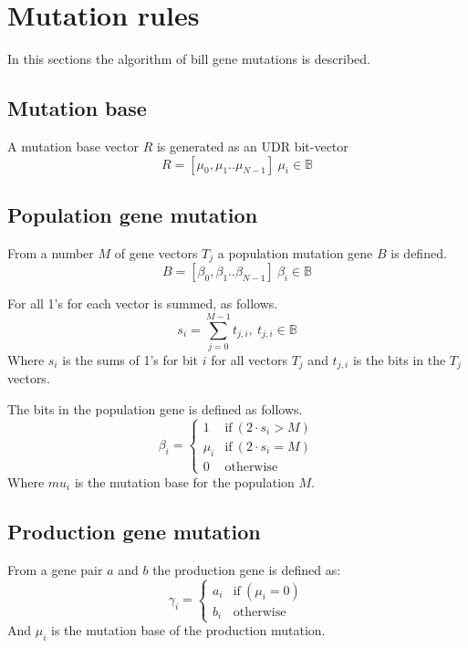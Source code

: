 \section{Mutation rules}

In this sections the algorithm of bill gene mutations is described.

\subsection{Mutation base}
A mutation base vector $R$ is generated as an UDR bit-vector
\begin{equation}
 R = [\mu_{0}, \mu_{1} .. \mu_{N-1}] ~ \mu_{i} \in \mathbb{B}
\end{equation}

\subsection{Population gene mutation}
From a number $M$ of gene vectors $T_j$ a population mutation gene $B$ is defined.
\begin{equation}
 B = [\beta_{0}, \beta_{1} .. \beta_{N-1}] ~ \beta_{i} \in \mathbb{B}
\end{equation}

For all 1's for each vector is summed, as follows.
\begin{equation}
 s_{i} = \sum_{j=0}^{M-1}  t_{j,i}, ~ t_{j,i} \in \mathbb{B}
\end{equation}
Where $s_i$ is the sums of 1's for bit $i$ for all vectors $T_j$ and $t_{j,i}$ is the bits in the $T_j$ vectors.

The bits in the population gene is defined as follows.
\begin{equation}
 \beta_{i} = 
  \begin{cases}
  1 & \text{if} ~ ( 2 \cdot s_i > M) \\
  \mu_i & \text{if} ~ ( 2 \cdot s_i = M) \\
  0 & \text{otherwise}     
 \end{cases}
\end{equation}
Where $mu_i$ is the mutation base for the population $M$.

\subsection{Production gene mutation}
From a gene pair $a$ and $b$ the production gene is defined as:
\begin{equation}
 \gamma_{i} = 
  \begin{cases}
  a_i & \text{if} ~ ( \mu_i = 0) \\
  b_i & \text{otherwise}     
 \end{cases}
\end{equation}
And $\mu_i$ is the mutation base of the production mutation.

